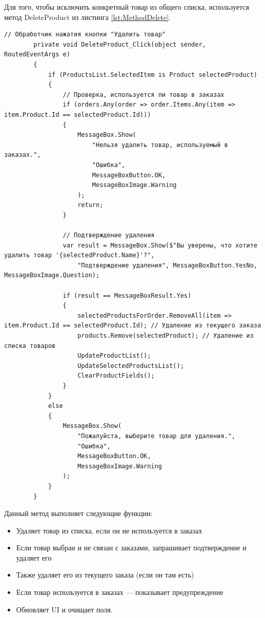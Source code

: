 \documentclass[12pt]{article}
\newcommand{\colorGIT}[1]{\textcolor{CtpGreen}{#1}}
\begin{document}
\pagebreak

Для того, чтобы исключить конкретный товар из общего списка, используется метод Delete\-Product из листинга \ref{lst:MethodDelete}.

\begin{lstlisting}[style=csharp_catppuccin, caption=\colorGIT{\href{https://github.com/WebMasterIT/Csharp_Labs/blob/ec375afd16c0647b337cf3d8a79c8bef904fc1be/3lab/StoreManager/MainWindow.xaml.cs\#L112-L141}{Метод}} удаления товара, label=lst:MethodDelete]
        // Обработчик нажатия кнопки "Удалить товар"
        private void DeleteProduct_Click(object sender, RoutedEventArgs e)
        {
            if (ProductsList.SelectedItem is Product selectedProduct)
            {
                // Проверка, используется ли товар в заказах
                if (orders.Any(order => order.Items.Any(item => item.Product.Id == selectedProduct.Id)))
                {
                    MessageBox.Show(
                        "Нельзя удалить товар, используемый в заказах.",
                        "Ошибка",
                        MessageBoxButton.OK,
                        MessageBoxImage.Warning
                    );
                    return;
                }

                // Подтверждение удаления
                var result = MessageBox.Show($"Вы уверены, что хотите удалить товар '{selectedProduct.Name}'?", 
                    "Подтверждение удаления", MessageBoxButton.YesNo, MessageBoxImage.Question);

                if (result == MessageBoxResult.Yes)
                {
                    selectedProductsForOrder.RemoveAll(item => item.Product.Id == selectedProduct.Id); // Удаление из текущего заказа
                    products.Remove(selectedProduct); // Удаление из списка товаров
                    UpdateProductList();
                    UpdateSelectedProductsList();
                    ClearProductFields();
                }
            }
            else
            {
                MessageBox.Show(
                    "Пожалуйста, выберите товар для удаления.",
                    "Ошибка",
                    MessageBoxButton.OK,
                    MessageBoxImage.Warning
                );
            }
        }
\end{lstlisting}


\noindent Данный метод выполняет следующие функции:
\begin{itemize}
	\item Удаляет товар из списка, если он не используется в заказах
	\item Если товар выбран и не связан с заказами, запрашивает подтверждение и удаляет его
	\item Также удаляет его из текущего заказа (если он там есть)
	\item Если товар используется в заказах — показывает предупреждение
	\item Обновляет UI и очищает поля.
\end{itemize}
\end{document}
